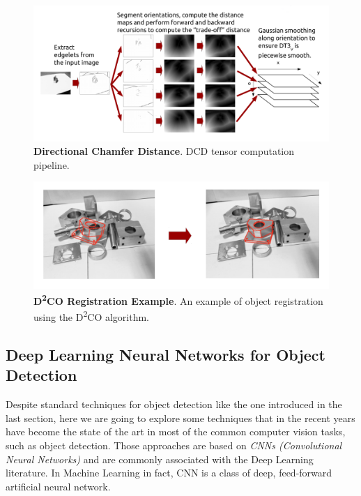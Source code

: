 \begin{figure}
    \centering
    \includegraphics[width=\textwidth]{figures/1_perception_and_sensing_in_robotics/d2co_01}
    \caption{\textbf{Directional Chamfer Distance}. DCD tensor computation pipeline.} 
    \label{fig:d2co_01}
\end{figure}

\begin{figure}
    \centering
    \includegraphics[width=\textwidth]{figures/1_perception_and_sensing_in_robotics/d2co_02}
    \caption{\textbf{D\textsuperscript{2}{CO} Registration Example}. An example of object registration using the D\textsuperscript{2}{CO} algorithm.} 
    \label{fig:d2co_02}
\end{figure}

\subsection{Deep Learning Neural Networks for Object Detection}\label{subsec:dl_obj_detection}
Despite standard techniques for object detection like the one introduced in the last section, here we are going to explore some techniques that in the recent years have become the state of the art in most of the common computer vision tasks, such as object detection. Those approaches are based on \emph{CNNs (Convolutional Neural Networks)} and are commonly associated with the Deep Learning literature. In Machine Learning in fact, CNN is a class of deep, feed-forward artificial neural network. 

